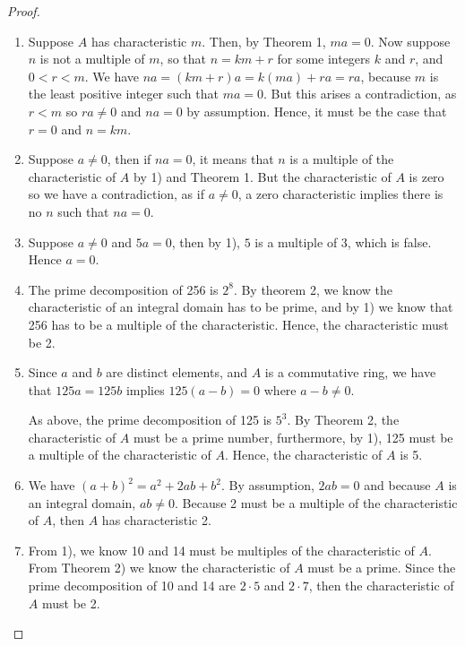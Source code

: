 \begin{proof}
 \begin{enumerate}
     \item Suppose $A$ has characteristic $m$. Then, by Theorem 1, $ma=0$. Now suppose $n$ is not a multiple of $m$, so that $n=km+r$ for some integers $k$ and $r$, and $0<r<m$. We have $na=(km+r)a=k(ma)+ra=ra$, because $m$ is the least positive integer such that $ma=0$. But this arises a contradiction, as $r<m$ so $ra\neq 0$ and $na=0$ by assumption. Hence, it must be the case that $r=0$ and $n=km$.
     \item Suppose $a\neq 0$, then if $na=0$, it means that $n$ is a multiple of the characteristic of $A$ by 1) and Theorem 1. But the characteristic of $A$ is zero so we have a contradiction, as if $a\neq 0$, a zero characteristic implies there is no $n$ such that $na=0$.
     \item Suppose $a\neq 0$ and $5a=0$, then by 1), $5$ is a multiple of 3, which is false. Hence $a=0$.
     \item The prime decomposition of 256 is $2^{8}$. By theorem 2, we know the characteristic of an integral domain has to be prime, and by 1) we know that 256 has to be a multiple of the characteristic. Hence, the characteristic must be 2.
     \item Since $a$ and $b$ are distinct elements, and $A$ is a commutative ring, we have that $125a=125b$ implies $125(a-b)=0$ where $a-b\neq 0$.

     As above, the prime decomposition of 125 is $5^{3}$. By Theorem 2, the characteristic of $A$ must be a prime number, furthermore, by 1), 125 must be a multiple of the characteristic of $A$. Hence, the characteristic of $A$ is 5.
     \item We have $(a+b)^{2}=a^{2}+2ab+b^{2}$. By assumption, $2ab=0$ and because $A$ is an integral domain, $ab\neq 0$. Because 2 must be a multiple of the characteristic of $A$, then $A$ has characteristic 2.
     \item From 1), we know 10 and 14 must be multiples of the characteristic of $A$. From Theorem 2) we know the characteristic of $A$ must be a prime. Since the prime decomposition of 10 and 14 are $2\cdot 5$ and $2\cdot 7$, then the characteristic of $A$ must be 2.
 \end{enumerate}
\end{proof}


